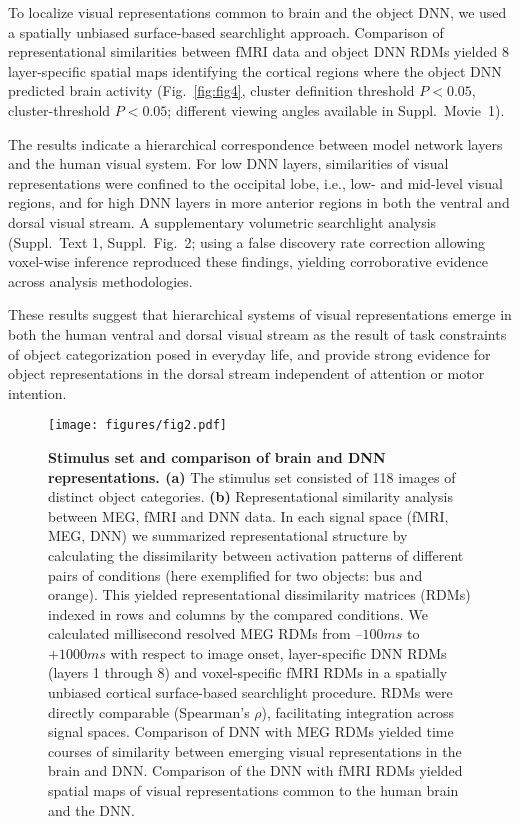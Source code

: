 \documentclass[10pt,twocolumn,letterpaper]{article}
\begin{document}
To localize visual representations common to brain and the object DNN, we used a spatially unbiased surface-based searchlight approach. Comparison of representational similarities between fMRI data and object DNN RDMs yielded 8 layer-specific spatial maps identifying the cortical regions where the object DNN predicted brain activity (Fig.~\ref{fig:fig4}, cluster definition threshold $P < 0.05$, cluster-threshold $P < 0.05$; different viewing angles available in Suppl.~Movie~1).

The results indicate a hierarchical correspondence between model network layers and the human visual system. For low DNN layers, similarities of visual representations were confined to the occipital lobe, i.e., low- and mid-level visual regions, and for high DNN layers in more anterior regions in both the ventral and dorsal visual stream. A supplementary volumetric searchlight analysis (Suppl.~Text 1, Suppl.~Fig.~2; using a false discovery rate correction allowing voxel-wise inference reproduced these findings, yielding corroborative evidence across analysis methodologies.

These results suggest that hierarchical systems of visual representations emerge in both the human ventral and dorsal visual stream as the result of task constraints of object categorization posed in everyday life, and provide strong evidence for object representations in the dorsal stream independent of attention or motor intention.

\begin{figure*}[t]
\begin{center}
   \texttt{[image: figures/fig2.pdf]}
\end{center}
\vspace*{-4mm}
\caption{\textbf{Stimulus set and comparison of brain and DNN representations. (a)} The stimulus set consisted of 118 images of distinct object categories. \textbf{(b)} Representational similarity analysis between MEG, fMRI and DNN data. In each signal space (fMRI, MEG, DNN) we summarized representational structure by calculating the dissimilarity between activation patterns of different pairs of conditions (here exemplified for two objects: bus and orange). This yielded representational dissimilarity matrices (RDMs) indexed in rows and columns by the compared conditions. We calculated millisecond resolved MEG RDMs from $–100ms$ to $+1000ms$ with respect to image onset, layer-specific DNN RDMs (layers 1 through 8) and voxel-specific fMRI RDMs in a spatially unbiased cortical surface-based searchlight procedure. RDMs were directly comparable (Spearman's $\rho$), facilitating integration across signal spaces. Comparison of DNN with MEG RDMs yielded time courses of similarity between emerging visual representations in the brain and DNN. Comparison of the DNN with fMRI RDMs yielded spatial maps of visual representations common to the human brain and the DNN.}
\label{fig:fig2}
\end{figure*}
\end{document}
